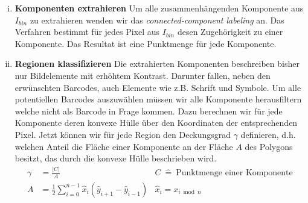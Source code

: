 \begin{enumerate}[(i)]
  \item \textbf{Komponenten extrahieren}
    Um alle zusammenhängenden Komponente aus \(I_{bin}\) zu extrahieren wenden
    wir das \textit{connected-component labeling} \cite[69--75]{compvis2001} an.
    Das Verfahren bestimmt für jedes Pixel aus \(I_{bin}\) desen Zugehörigkeit
    zu einer Komponente. Das Resultat ist eine Punktmenge für jede Komponente.
  
  \item \textbf{Regionen klassifizieren}
    Die extrahierten Komponenten beschreiben bisher nur Bildelemente mit
    erhöhtem Kontrast. Darunter fallen, neben den erwünschten Barcodes, auch
    Elemente wie z.B. Schrift und Symbole. Um alle potentiellen Barcodes
    auszuwählen müssen wir alle Komponente herausfiltern welche nicht als
    Barcode in Frage kommen. Dazu berechnen wir für jede Komponente deren
    konvexe Hülle \cite[6--7]{compgeom2008} über den Koordinaten der
    entsprechenden Pixel. Jetzt können wir für jede Region den Deckungsgrad \(
    \gamma \) definieren, d.h. welchen Anteil die Fläche einer Komponente an der
    Fläche \( A \) des Polygons \cite{braden1986} besitzt, das durch die
    konvexe Hülle beschrieben wird.
    \begin{align*}
      \gamma &= \frac{|C|}{A}
             & C~\hat=~\text{Punktmenge einer Komponente} \\
      A      &= \frac{1}{2} \sum_{i=0}^{n-1}{\hat x_i (\hat y_{i+1} - \hat
                                             y_{i-1})}
             & \hat x_i = x_{i \bmod n}
    \end{align*}

    \cite[4]{DBLP:conf/cvpr/DalalT05}
\end{enumerate}
